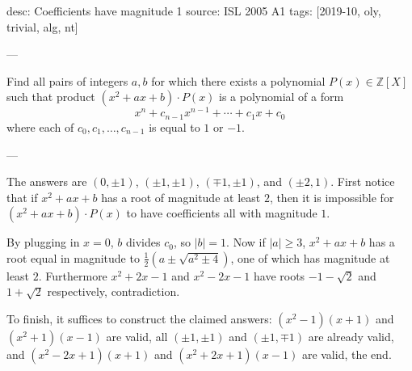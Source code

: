 desc: Coefficients have magnitude 1
source: ISL 2005 A1
tags: [2019-10, oly, trivial, alg, nt]

---

Find all pairs of integers $a,b$ for which there exists a polynomial $P(x)\in\mathbb Z[X]$ such that product $(x^2+ax+b)\cdot P(x)$ is a polynomial of a form \[x^n+c_{n-1}x^{n-1}+\cdots+c_1x+c_0 \]
where each of $c_0,c_1,\ldots,c_{n-1}$ is equal to $1$ or $-1$.

---

The answers are $(0,\pm1)$, $(\pm1,\pm1)$, $(\mp1,\pm1)$, and $(\pm2,1)$. First notice that if $x^2+ax+b$ has a root of magnitude at least $2$, then it is impossible for $(x^2+ax+b)\cdot P(x)$ to have coefficients all with magnitude $1$.

By plugging in $x=0$, $b$ divides $c_0$, so $|b|=1$. Now if $|a|\ge3$, $x^2+ax+b$ has a root equal in magnitude to $\frac12(a\pm\sqrt{a^2\pm4})$, one of which has magnitude at least $2$. Furthermore $x^2+2x-1$ and $x^2-2x-1$ have roots $-1-\sqrt2$ and $1+\sqrt2$ respectively, contradiction.

To finish, it suffices to construct the claimed answers: $(x^2-1)(x+1)$ and $(x^2+1)(x-1)$ are valid, all $(\pm1,\pm1)$ and $(\pm1,\mp1)$ are already valid, and $(x^2-2x+1)(x+1)$ and $(x^2+2x+1)(x-1)$ are valid, the end.
